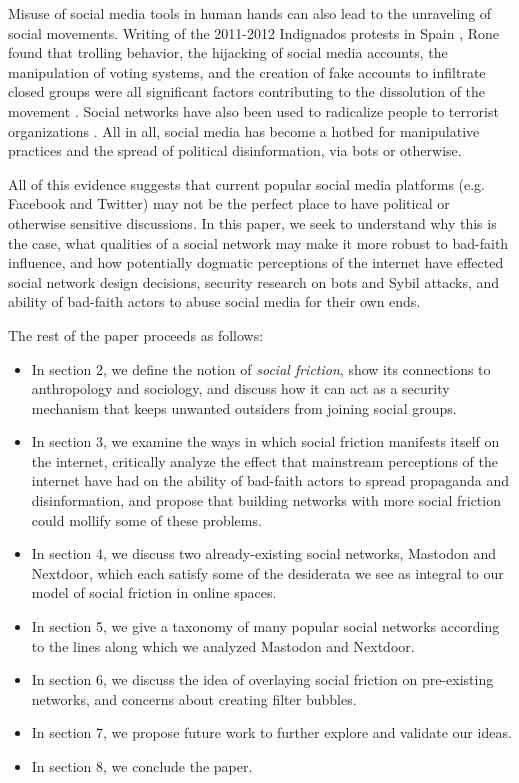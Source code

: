 \documentclass[sigconf,authordraft]{acmart}
\begin{document}
Misuse of social media tools in human hands can also lead to the unraveling of social movements. Writing of the 2011-2012 Indignados protests in Spain \cite{indignadosBBC}, Rone found that trolling behavior, the hijacking of social media accounts, the manipulation of voting systems, and the creation of fake accounts to infiltrate closed groups were all significant factors contributing to the dissolution of the movement \cite{rone2019fake}. Social networks have also been used to radicalize people to terrorist organizations \cite{o2007virtual,Thompson2011radicalization}. All in all, social media has become a hotbed for manipulative practices and the spread of political disinformation, via bots or otherwise\cite{benkler2018network}.

All of this evidence suggests that current popular social media platforms (e.g. Facebook and Twitter) may not be the perfect place to have political or otherwise sensitive discussions. In this paper, we seek to understand why this is the case, what qualities of a social network may make it more robust to bad-faith influence, and how potentially dogmatic perceptions of the internet have effected social network design decisions, security research on bots and Sybil attacks, and ability of bad-faith actors to abuse social media for their own ends. 

The rest of the paper proceeds as follows:

\begin{itemize}
\item In section 2, we define the notion of \textit{social friction}, show its connections to anthropology and sociology, and discuss how it can act as a security mechanism that keeps unwanted outsiders from joining social groups.
\item In section 3, we examine the ways in which social friction manifests itself on the internet, critically analyze the effect that mainstream perceptions of the internet have had on the ability of bad-faith actors to spread propaganda and disinformation, and propose that building networks with more social friction could mollify some of these problems.
\item In section 4, we discuss two already-existing social networks, Mastodon and Nextdoor, which each satisfy some of the desiderata we see as integral to our model of social friction in online spaces.
\item In section 5, we give a taxonomy of many popular social networks according to the lines along which we analyzed Mastodon and Nextdoor.
\item In section 6, we discuss the idea of overlaying social friction on pre-existing networks, and concerns about creating filter bubbles.
\item In section 7, we propose future work to further explore and validate our ideas.
\item In section 8, we conclude the paper.  
\end{itemize}
\end{document}
